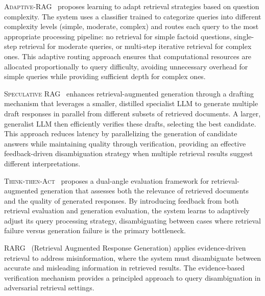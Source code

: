 \documentclass{article}
\begin{document}
\textsc{Adaptive-RAG}~\citep{AdaptiveRAG} proposes learning to adapt retrieval strategies based on question complexity. The system uses a classifier trained to categorize queries into different complexity levels (simple, moderate, complex) and routes each query to the most appropriate processing pipeline: no retrieval for simple factoid questions, single-step retrieval for moderate queries, or multi-step iterative retrieval for complex ones. This adaptive routing approach ensures that computational resources are allocated proportionally to query difficulty, avoiding unnecessary overhead for simple queries while providing sufficient depth for complex ones.

\textsc{Speculative RAG}~\citep{SpeculativeRAG} enhances retrieval-augmented generation through a drafting mechanism that leverages a smaller, distilled specialist LLM to generate multiple draft responses in parallel from different subsets of retrieved documents. A larger, generalist LLM then efficiently verifies these drafts, selecting the best candidate. This approach reduces latency by parallelizing the generation of candidate answers while maintaining quality through verification, providing an effective feedback-driven disambiguation strategy when multiple retrieval results suggest different interpretations.

\textsc{Think-then-Act}~\citep{Think-then-Act} proposes a dual-angle evaluation framework for retrieval-augmented generation that assesses both the relevance of retrieved documents and the quality of generated responses. By introducing feedback from both retrieval evaluation and generation evaluation, the system learns to adaptively adjust its query processing strategy, disambiguating between cases where retrieval failure versus generation failure is the primary bottleneck.

\textsc{RARG}~\citep{RARG} (Retrieval Augmented Response Generation) applies evidence-driven retrieval to address misinformation, where the system must disambiguate between accurate and misleading information in retrieved results. The evidence-based verification mechanism provides a principled approach to query disambiguation in adversarial retrieval settings.
\end{document}
